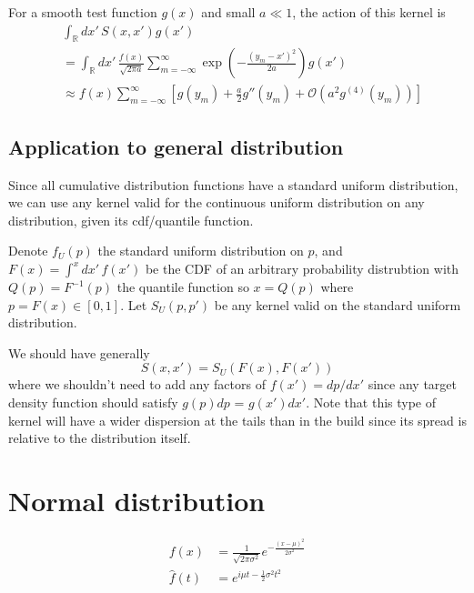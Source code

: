 \documentclass{article}
\newcommand{\intR}{\int_{\mathbb{R}}}
\begin{document}
For a smooth test function $g(x)$ and small $a \ll 1$, the action of this
kernel is
\begin{align}
  &\intR dx' \, S(x, x') g(x') \\
  &= \intR dx' \, \frac{f(x)}{\sqrt{2\pi a}} \sum_{m=-\infty}^\infty \exp\left(-\frac{(y_m - x')^2}{2a}\right) g(x')\\
    &\approx f(x) \sum_{m=-\infty}^\infty \left[g(y_m) + \frac{a}{2} g''(y_m) + \mathcal{O}\left(a^2 g^{(4)}(y_m)\right)\right]
\end{align}

\subsection{Application to general distribution}

Since all cumulative distribution functions have a standard uniform
distribution, we can use any kernel valid for the continuous uniform
distribution on any distribution, given its cdf/quantile function.

Denote $f_U(p)$ the standard uniform distribution on $p$, and
$F(x) = \int^x dx'\, f(x')$ be the CDF of an arbitrary probability distrubtion
with $Q(p) = F^{-1}(p)$ the quantile function so $x = Q(p)$ where $p = F(x) \in
[0, 1]$. Let $S_U(p, p')$ be any kernel valid on the standard uniform
distribution.

We should have generally
\begin{equation}
  S(x, x') = S_U\left(F(x), F(x')\right)
\end{equation}
where we shouldn't need to add any factors of $f(x') = dp/dx'$ since any target
density function should satisfy $g(p) dp$ = $g(x') dx'$. Note that this type of
kernel will have a wider dispersion at the tails than in the build since its
spread is relative to the distribution itself.

\section{Normal distribution}
\begin{align}
  f(x) &= \frac{1}{\sqrt{2\pi\sigma^2}} e^{-\frac{(x - \mu)^2}{2\sigma^2}} \\
	\hat f(t) &= e^{i\mu t - \frac{1}{2}\sigma^2 t^2}
	\label{eq:normal_char}
\end{align}
\end{document}
